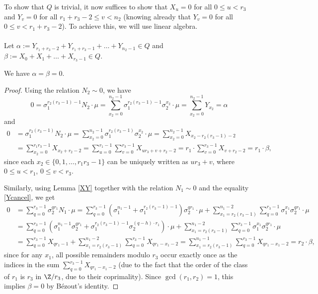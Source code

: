 To show that $Q$ is trivial, it now suffices to show that $X_u=0$ for all $0\leq u< r_3$ and $Y_v=0$ for all $r_1+r_3-2\leq v< n_2$ (knowing already that  $Y_v = 0$ 
for all $0 \le v < r_1 +r_3 - 2$). To achieve this, we will use linear algebra.

%
\paragraph*{}
Let $\alpha:= Y_{r_1+r_3-2}+Y_{r_1+r_3-1}+\dots+Y_{n_2-1}\in Q$ and $\beta:=X_0+X_1+\dots+X_{r_3-1}\in Q$.
\begin{lemma}\label{AB}
We have $\alpha=\beta=0$.
\end{lemma}
\begin{proof}
Using the relation $N_2\sim 0$, we have $$0=\sigma_1^{r_2(r_3-1)-1}N_2\cdot \mu =\sum_{x_2=0}^{n_2-1}  \sigma_1^{r_2(r_3-1)-1}\sigma_2^{x_2}\cdot \mu= \sum_{x_2=0}^{n_2-1}Y_{x_2}=\alpha$$ and
\begin{align*}
0&= \sigma_1^{r_2(r_3-1)}N_2\cdot \mu=\sum_{x_2=0}^{n_2-1}  \sigma_1^{r_2(r_3-1)}\sigma_2^{x_2}\cdot \mu=\sum_{x_2=0}^{n_2-1}  X_{x_2-r_2(r_3-1)-2}\\
&=\sum_{x_2=0}^{r_1r_3-1}  X_{x_2+r_2-2}=
\sum_{u=0}^{r_1-1}\sum_{v=0}^{r_3-1} X_{ur_3+v+r_2-2}=r_1\cdot \sum_{v=0}^{r_3-1} X_{v+r_2-2}=r_1\cdot \beta,
\end{align*}
since each $x_2\in\{0,1,\dots,r_1r_3-1\}$ can be uniquely written as $ur_3+v$, where $0\leq u<r_1$, $0\leq v<r_3$.%

Similarly, using Lemma \ref{XY} together with the relation $N_1\sim 0$ and the equality \eqref{Ycancel}, %
we get
\begin{align*}
0&= \sum_{q=0}^{r_3-1} \sigma_2^{qr_1}N_1\cdot \mu =\sum_{q=0}^{r_3-1}\left(\sigma_1^{n_1-1}+\sigma_1^{r_2(r_3-1)-1}\right) \sigma_2^{qr_1}\cdot \mu   
+\sum_{x_1=r_2(r_3-1)}^{n_1-2}\sum_{q=0}^{r_3-1} \sigma_1^{x_1}\sigma_2^{qr_1}\cdot \mu\\
&=\sum_{q=0}^{r_3-1}(\sigma_1^{n_1-1}\sigma_2^{qr_1}+\sigma_1^{r_2(r_3-1)-1}\sigma_2^{(q-h)\cdot r_1})\cdot \mu
+\sum_{x_1=r_2(r_3-1)}^{n_1-2}\sum_{q=0}^{r_3-1} \sigma_1^{x_1}\sigma_2^{qr_1}\cdot \mu\\
&=\sum_{q=0}^{r_3-1}X_{qr_1-1}+\sum_{x_1=r_2(r_3-1)}^{n_1-2}\sum_{q=0}^{r_3-1}X_{qr_1-x_1-2}
= \sum_{x_1=r_2(r_3-1)}^{n_1-1}\sum_{q=0}^{r_3-1}X_{qr_1-x_1-2}
=r_2\cdot \beta,
\end{align*}
since for any $x_1$, all possible remainders modulo $r_3$ occur exactly once as the indices in the sum $\sum_{q=0}^{r_3-1}X_{qr_1-x_1-2}$ (due to the fact that the order of the class of $r_1$ is $r_3$ in $\Z/r_3$, due to their coprimality).
Since $\gcd(r_1,r_2)=1$, this implies $\beta=0$ by Bézout's identity.
\end{proof}

